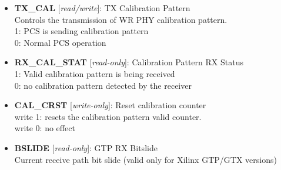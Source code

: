 \begin{itemize}
\item \begin{small}
{\bf 
TX\_CAL
} [\emph{read/write}]: TX Calibration Pattern
\\
Controls the transmission of WR PHY calibration pattern. \\				                1: PCS is sending calibration pattern\\				                0: Normal PCS operation
\end{small}
\item \begin{small}
{\bf 
RX\_CAL\_STAT
} [\emph{read-only}]: Calibration Pattern RX Status
\\
1: Valid calibration pattern is being received\\				                0: no calibration pattern detected by the receiver
\end{small}
\item \begin{small}
{\bf 
CAL\_CRST
} [\emph{write-only}]: Reset calibration counter
\\
write 1: resets the calibration pattern valid counter. \\			                write 0: no effect
\end{small}
\item \begin{small}
{\bf 
BSLIDE
} [\emph{read-only}]: GTP RX Bitslide
\\
Current receive path bit slide (valid only for Xilinx GTP/GTX versions)
\end{small}
\end{itemize}



